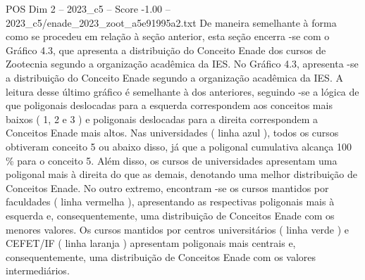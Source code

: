 \begin{textsample}{POS Dim 2 – 2023\_c5 – Score -1.00 – 2023\_c5/enade\_2023\_zoot\_a5e91995a2.txt}
De maneira semelhante à forma como se procedeu em relação à seção anterior, esta seção encerra -se com o Gráfico 4.3, que apresenta a distribuição do Conceito Enade dos cursos de Zootecnia segundo a organização acadêmica da IES.
No Gráfico 4.3, apresenta -se a distribuição do Conceito Enade segundo a organização acadêmica da IES.
A leitura desse último gráfico é semelhante à dos anteriores, seguindo -se a lógica de que poligonais deslocadas para a esquerda correspondem aos conceitos mais baixos ( 1, 2 e 3 ) e poligonais deslocadas para a direita correspondem a Conceitos Enade mais altos.
Nas universidades ( linha azul ), todos os cursos obtiveram conceito 5 ou abaixo disso, já que a poligonal cumulativa alcança 100 \% para o conceito 5.
Além disso, os cursos de universidades apresentam uma poligonal mais à direita do que as demais, denotando uma melhor distribuição de Conceitos Enade.
No outro extremo, encontram -se os cursos mantidos por faculdades ( linha vermelha ), apresentando as respectivas poligonais mais à esquerda e, consequentemente, uma distribuição de Conceitos Enade com os menores valores.
Os cursos mantidos por centros universitários ( linha verde ) e CEFET/IF ( linha laranja ) apresentam poligonais mais centrais e, consequentemente, uma distribuição de Conceitos Enade com os valores intermediários.

\end{textsample}
